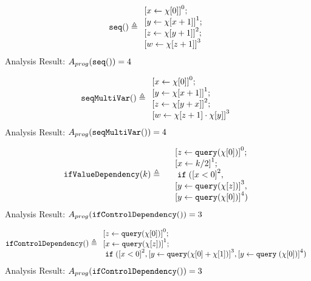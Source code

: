 \begin{example}
    \[
        \kw{seq()} \triangleq 
    \begin{array}{l} 
           \clabel{ \assign{x}{\chi[0]}}^{0} ; \\
            \clabel{\assign{y}{\chi[x + 1]} }^{1} ; \\
            \clabel{\assign{z}{\chi[y + 1]}}^{2}; \\
             \clabel{\assign{w}{\chi[z + 1]} }^{3}
        \end{array}
    \]
    Analysis Result: $ A_{{prog}}( \mathtt{seq()}) = 4$
    \end{example}
%
\begin{example}
    \[
        \kw{seqMultiVar()} \triangleq 
    \begin{array}{l} 
           \clabel{ \assign{x}{\chi[0]}}^{0} ; \\
            \clabel{\assign{y}{\chi[x + 1]} }^{1} ; \\
            \clabel{\assign{z}{\chi[y + x]}}^{2}; \\
             \clabel{\assign{w}{\chi[z + 1] \cdot \chi[y]} }^{3}
        \end{array}
    \]
    Analysis Result: $ A_{{prog}}(\mathtt{seqMultiVar()}) = 4$
\end{example}
%
    \begin{example}
        \[
        \kw{ifValueDependency}(k) \triangleq 
        \begin{array}{l}
           \quad \clabel{ \assign{z}{\query(\chi[0])}}^{0} ; \\
           \quad \clabel{\assign{x}{k / 2} }^{1} ; \\
           \quad \eif(\clabel{x < 0}^2, \\
           \quad \clabel{\assign{y}{\query(\chi[z])}}^{3}, \\ 
           \quad \clabel{\assign{y}{\query(\chi[0])}}^{4})
            \end{array}
        \]
        Analysis Result: $ A_{{prog}}( \mathtt{ifControlDependency()}) = 3$
    \end{example}

        \begin{example}
            \[
            \kw{ifControlDependency()} \triangleq 
            \begin{array}{l}
                \clabel{ \assign{z}{\query(\chi[0])}}^{0} ; \\
                \clabel{\assign{x}{\query(\chi[z])} }^{1} ; \\
                \eif(\clabel{x < 0}^{2}, 
                \clabel{\assign{y}{\query(\chi[0] + \chi[1])}}^{3}, 
                \clabel{\assign{y}\query{(\chi[0])}}^{4})
            \end{array}
            \]
            Analysis Result: $ A_{{prog}}( \mathtt{ifControlDependency()}) = 3$
            \end{example}



